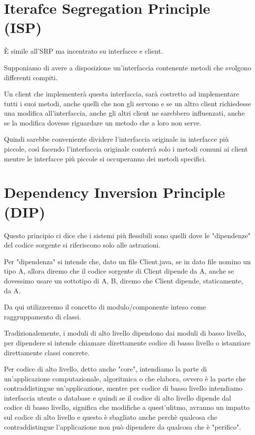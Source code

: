 \newpage
\section{Iterafce Segregation Principle (ISP)}

È simile all’SRP ma incentrato su interfacce e client.
\smallskip

Supponiamo di avere a disposizione un'interfaccia contenente metodi che svolgono differenti compiti.

Un client che implementerà questa interfaccia, sarà costretto ad implementare tutti i suoi metodi, anche quelli che non gli servono e se un altro client richiedesse una 
modifica all’interfaccia, anche gli altri client ne sarebbero influenzati, anche se la modifica dovesse riguardare un metodo che a loro non serve.

Quindi sarebbe conveniente dividere l'interfaccia originale in interfacce più piccole, così facendo l'interfaccia originale conterrà solo i metodi comuni ai client 
mentre le interfacce più piccole si occuperanno dei metodi specifici.

\section{Dependency Inversion Principle (DIP)}

Questo principio ci dice che i sistemi più flessibili sono quelli dove le "dipendenze" del codice sorgente si riferiscono solo alle astrazioni.

Per "dipendenza" si intende che, dato un file Client.java, se in dato file nomino un tipo A, allora diremo che il codice sorgente di Client dipende da A, anche se 
dovessimo usare un sottotipo di A, B, diremo che Client dipende, staticamente, da A.

Da qui utilizzeremo il concetto di modulo/componente inteso come raggruppamento di classi.
\smallskip

Tradizionalemente, i moduli di alto livello dipendono dai moduli di basso livello, per dipendere si intende chiamare direttamente codice di basso livello o istanziare
direttamente classi concrete.

Per codice di alto livello, detto anche "core", intendiamo la parte di un'applicazione computazionale, algoritmica o che elabora, ovvero è la parte che contraddistingue 
un'applicazione, mentre per codice di basso livello intendiamo interfaccia utente o database e quindi se il codice di alto livello dipende dal codice di basso livello, 
significa che modifiche a quest'ulitmo, avranno un impatto sul codice di alto livello e questo è sbagliato anche perchè qualcosa che contraddistingue l'applicazione
non può dipendere da qualcosa che è "perifico".

